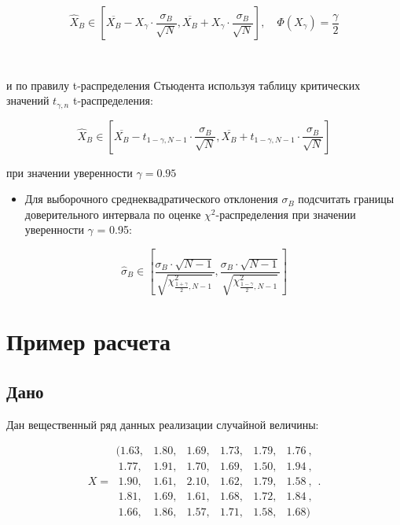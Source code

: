 \documentclass[
]{article}
\providecommand{\tightlist}{%
  \setlength{\itemsep}{0pt}\setlength{\parskip}{0pt}}
\begin{document}
\[
\hat{X}_{B} \in \left[ \overline{X_{B}} - X_{\gamma} \cdot \frac{\sigma_{B}}{\sqrt{N}}, \overline{X_{B}} + X_{\gamma} \cdot \frac{\sigma_{B}}{\sqrt{N}} \right], \quad \Phi(X_{\gamma}) = \frac{\gamma}{2}
\]

~

и по правилу t-распределения Стьюдента используя таблицу критических
значений \(t_{\gamma, n}\) t-распределения:

\[
\hat{X}_{B} \in \left[ \overline{X_{B}} - t_{1- \gamma, N-1} \cdot \frac{\sigma_{B}}{\sqrt{N}}, \overline{X_{B}} + t_{1-\gamma, N-1} \cdot \frac{\sigma_{B}}{\sqrt{N}} \right]
\]

при значении уверенности \(\gamma = 0.95\)

\begin{itemize}
\tightlist
\item
  Для выборочного среднеквадратического отклонения \(\sigma_{B}\)
  подсчитать границы доверительного интервала по оценке
  \(\chi^2\)-распределения при значении уверенности \(\gamma\) = 0.95:
\end{itemize}

\[
\hat{\sigma}_{B} \in \left[ \frac{\sigma_{B}\cdot \sqrt{N-1}}{\sqrt{\chi_{\frac{1+\gamma}{2},N-1}^2}},  \frac{\sigma_{B} \cdot \sqrt{N-1}}{\sqrt{\chi_{\frac{1-\gamma}{2}, N-1}^2}} \right]
\]

\hypertarget{ux43fux440ux438ux43cux435ux440-ux440ux430ux441ux447ux435ux442ux430}{%
\section{\texorpdfstring{\textbf{Пример
расчета}}{Пример расчета}}\label{ux43fux440ux438ux43cux435ux440-ux440ux430ux441ux447ux435ux442ux430}}

\hypertarget{ux434ux430ux43dux43e}{%
\subsection{\texorpdfstring{\textbf{Дано}}{Дано}}\label{ux434ux430ux43dux43e}}

Дан вещественный ряд данных реализации случайной величины:

\[
X = \begin{matrix}
 (1.63, & 1.80, & 1.69, & 1.73, & 1.79, & 1.76\ , \\
\ 1.77, & 1.91, & 1.70, & 1.69, & 1.50, & 1.94\ , \\ 
\ 1.90, & 1.61, & 2.10, & 1.62, & 1.79, & 1.58\ , \\
\ 1.81, & 1.69, & 1.61, & 1.68, & 1.72, & 1.84\ , \\
\ 1.66, & 1.86, & 1.57, & 1.71, & 1.58, & 1.68)
\end{matrix}.
\]
\end{document}
